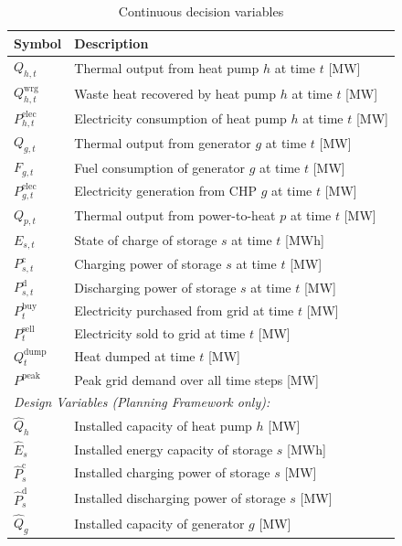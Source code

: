 \documentclass[11pt]{article}
\begin{document}
\begin{table}[h]
\centering
\begin{tabular}{ll}
\toprule
\textbf{Symbol} & \textbf{Description} \\
\midrule
$Q_{h,t}$ & Thermal output from heat pump $h$ at time $t$ [MW] \\
$Q_{h,t}^{\text{wrg}}$ & Waste heat recovered by heat pump $h$ at time $t$ [MW] \\
$P_{h,t}^{\text{elec}}$ & Electricity consumption of heat pump $h$ at time $t$ [MW] \\
$Q_{g,t}$ & Thermal output from generator $g$ at time $t$ [MW] \\
$F_{g,t}$ & Fuel consumption of generator $g$ at time $t$ [MW] \\
$P_{g,t}^{\text{elec}}$ & Electricity generation from CHP $g$ at time $t$ [MW] \\
$Q_{p,t}$ & Thermal output from power-to-heat $p$ at time $t$ [MW] \\
$E_{s,t}$ & State of charge of storage $s$ at time $t$ [MWh] \\
$P_{s,t}^{\text{c}}$ & Charging power of storage $s$ at time $t$ [MW] \\
$P_{s,t}^{\text{d}}$ & Discharging power of storage $s$ at time $t$ [MW] \\
$P_t^{\text{buy}}$ & Electricity purchased from grid at time $t$ [MW] \\
$P_t^{\text{sell}}$ & Electricity sold to grid at time $t$ [MW] \\
$Q_t^{\text{dump}}$ & Heat dumped at time $t$ [MW] \\
$P^{\text{peak}}$ & Peak grid demand over all time steps [MW] \\
\midrule
\multicolumn{2}{l}{\textit{Design Variables (Planning Framework only):}} \\
$\hat{Q}_h$ & Installed capacity of heat pump $h$ [MW] \\
$\hat{E}_s$ & Installed energy capacity of storage $s$ [MWh] \\
$\hat{P}_s^{\text{c}}$ & Installed charging power of storage $s$ [MW] \\
$\hat{P}_s^{\text{d}}$ & Installed discharging power of storage $s$ [MW] \\
$\hat{Q}_g$ & Installed capacity of generator $g$ [MW] \\
\bottomrule
\end{tabular}
\caption{Continuous decision variables}
\label{tab:vars_cont}
\end{table}
\end{document}
